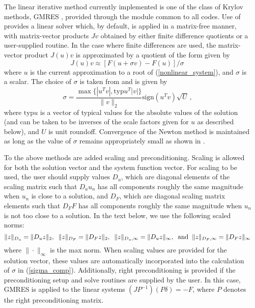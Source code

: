 The linear iterative method currently implemented is one of the
class of Krylov methods, GMRES \cite{BrHi:89,SaSc:86}, provided
through the {\spgmr} module common to all {\sundials} codes. Use of
{\spgmr} provides a linear solver which, by default, is applied in a
matrix-free manner, with matrix-vector products $Jv$ obtained by
either finite difference quotients or a user-supplied routine. In
the case where finite differences are used, the matrix-vector
product $J(u)v$ is approximated by a quotient of the form given by
\begin{equation}\label{jacobv}
J(u) v \approx [F(u+\sigma v) - F(u)]/\sigma \,
\end{equation}
where $u$ is the current approximation to a root of
(\ref{nonlinear_system}), and $\sigma$ is a scalar. The choice of
$\sigma$ is taken from \cite{BrSa:90} and is given by
\begin{equation}\label{sigma_comp}
  \sigma = \frac{\max \{|u^T v|, \mbox{typ}u^T |v|\}}{\|v\|_2}
  \mbox{sign}(u^T v) \sqrt{U} \, ,
\end{equation}
where $\mbox{typ}u$ is a vector of typical values for the absolute
values of the solution (and can be taken to be inverses of the
scale factors given for $u$ as described below), and $U$ is unit
roundoff. Convergence of the Newton method is maintained as long
as the value of $\sigma$ remains appropriately small as shown in
\cite{Bro:87}.

To the above methods are added scaling and preconditioning.
Scaling is allowed for both the solution vector and the system
function vector. For scaling to be used, the user should supply
values $D_u$, which are diagonal elements of the scaling matrix
such that $D_u u_n$ has all components roughly the same magnitude
when $u_n$ is close to a solution, and $D_F$, which are diagonal
scaling matrix elements such that $D_F F$ has all components
roughly the same magnitude when $u_n$ is not too close to a
solution. In the text below, we use the following scaled norms:
\begin{equation}
\|z\|_{D_u} = \|D_u z\|_2, \;\; \|z\|_{D_F} = \|D_F z\|_2, \;\;
\|z\|_{D_u,\infty} = \|D_u z\|_{\infty}, \;\; {\rm and} \;\;
\|z\|_{D_F,\infty} = \|D_F z\|_{\infty}
\end{equation}
where $\| \cdot \|_{\infty}$ is the max norm.  When scaling values
are provided for the solution vector, these values are
automatically incorporated into the calculation of $\sigma$ in
(\ref{sigma_comp}). Additionally, right preconditioning is
provided if the preconditioning setup and solve routines are
supplied by the user. In this case, GMRES is applied to the linear
systems $(JP^{-1})(P\delta) = -F$, where $P$ denotes the right
preconditioning matrix.

